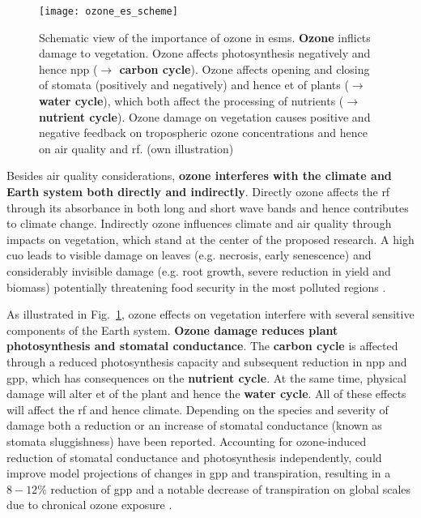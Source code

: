 \begin{figure}[!b]
  \centering
  \texttt{[image: ozone\_es\_scheme]}%
  \caption{Schematic view of the importance of ozone in \glspl{esm}. \textbf{\color{red}Ozone} inflicts damage to vegetation. Ozone affects photosynthesis negatively and hence \gls{npp} (\textbf{\color{darkgray}$\rightarrow$ carbon cycle}). Ozone affects opening and closing of stomata (positively and negatively) and hence \gls{et} of plants (\textbf{\color{blue}$\rightarrow$ water cycle}), which both affect the processing of nutrients (\textbf{\color{darkgray}$\rightarrow$ nutrient cycle}). Ozone damage on vegetation causes positive and negative feedback on tropospheric ozone concentrations and hence on air quality and \gls{rf}. (own illustration)}
  \label{fig:ozone_esm_scheme}
\end{figure}

Besides air quality considerations, \textbf{ozone interferes with the climate and Earth system both directly and indirectly}. Directly ozone affects the \gls{rf} through its absorbance in both long and short wave bands and hence contributes to climate change. Indirectly ozone influences climate and air quality through impacts on vegetation, which stand at the center of the proposed research. A high \gls{cuo} leads to visible damage on leaves (e.g. necrosis, early senescence) and considerably invisible damage (e.g. root growth, severe reduction in yield and biomass) potentially threatening food security in the most polluted regions \parencites{GCB:Mills2011}{PT:Emberson2020}.

As illustrated in Fig.~\ref{fig:ozone_esm_scheme}, ozone effects on vegetation interfere with several sensitive components of the Earth system. \textbf{Ozone damage reduces plant photosynthesis and stomatal conductance}. The \textbf{carbon cycle} is affected through a reduced photosynthesis capacity and subsequent reduction in \gls{npp} and \gls{gpp}, which has consequences on the \textbf{nutrient cycle}. At the same time, physical damage will alter \gls{et} of the plant and hence the \textbf{water cycle}. All of these effects will affect the \gls{rf} and hence climate. Depending on the species and severity of damage both a reduction \parencite{Oe:Lombardozzi2012} or an increase of stomatal conductance (known as stomata sluggishness) \parencite{SR:Hoshika2015} have been reported. Accounting for ozone-induced reduction of stomatal conductance and photosynthesis independently, \textcite{BGS:Lombardozzi2012} could improve model projections of changes in \gls{gpp} and transpiration, resulting in a $8-12\%$ reduction of \gls{gpp} and a notable decrease of transpiration on global scales due to chronical ozone exposure \parencite{JC:Lombardozzi2015}.

